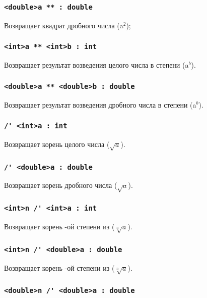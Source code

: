 \documentclass[a4paper, 14pt]{extarticle}
\begin{document}
\subsubsection{\lstinline`<double>a ** : double`}

Возвращает квадрат дробного числа  (a$^2$);

\subsubsection{\lstinline`<int>a ** <int>b : int`}

Возвращает результат возведения целого числа  в степени  (a$^b$).

\subsubsection{\lstinline`<double>a ** <double>b : double`}

Возвращает результат возведения дробного числа  в степени  (a$^b$).

\subsubsection{\lstinline`/' <int>a : int`}

Возвращает корень целого числа  ($\sqrt{a}$).

\subsubsection{\lstinline`/' <double>a : double`}

Возвращает корень дробного числа  ($\sqrt{a}$).

\subsubsection{\lstinline`<int>n /' <int>a : int`}

Возвращает корень -ой степени из  ($\sqrt[n]{a}$).

\subsubsection{\lstinline`<int>n /' <double>a : double`}

Возвращает корень -ой степени из  ($\sqrt[n]{a}$).

\subsubsection{\lstinline`<double>n /' <double>a : double`}
\end{document}
